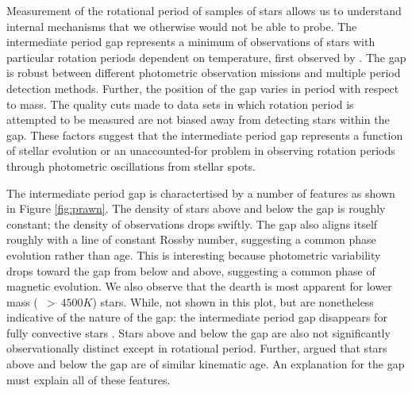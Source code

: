 Measurement of the rotational period of samples of stars allows us to understand internal mechanisms that we otherwise would not be able to probe.
The intermediate period gap represents a minimum of observations of stars with particular rotation periods dependent on temperature, first observed by \citet{mcquillan_rotation_2014}.
The gap is robust between different photometric observation missions \citep{mcquillan_rotation_2014,davenport_rotating_2017,davenport_rotating_2018,lu_bridging_2022} and multiple period detection methods.
Further, the position of the gap varies in period with respect to mass. 
The quality cuts made to data sets in which rotation period is attempted to be measured \citep[e.g. removing binaries and subgiants][]{mcquillan_rotation_2014, claytor_tess_2023} are not biased away from detecting stars within the gap.
These factors suggest that the intermediate period gap represents a function of stellar evolution or an unaccounted-for problem in observing rotation periods through photometric oscillations from stellar spots.

The intermediate period gap is charactertised by a number of features as shown in Figure \ref{fig:prawn}.
The density of stars above and below the gap is roughly constant; the density of observations drops swiftly.
The gap also aligns itself roughly with a line of constant Rossby number, suggesting a common phase evolution rather than age.
This is interesting because photometric variability drops toward the gap from below and above, suggesting a common phase of magnetic evolution.
We also observe that the dearth is most apparent for lower mass (\teff\ $>\ 4500K $) stars.
While, not shown in this plot, but are nonetheless indicative of the nature of the gap: the intermediate period gap disappears for fully convective stars \citep{lu_bridging_2022}.
Stars above and below the gap are also not significantly observationally distinct except in rotational period.
Further, \citet{lu_bridging_2022} argued that stars above and below the gap are of similar kinematic age.
An explanation for the gap must explain all of these features.

